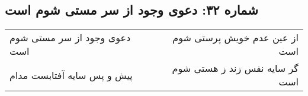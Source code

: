 \begin{center}
\section*{شماره ۳۲: دعوی وجود از سر مستی شوم است}
\label{sec:032}
\begin{longtable}{l p{0.5cm} r}
دعوی وجود از سر مستی شوم است
&&
از عین عدم خویش پرستی شوم است
\\
پیش و پس سایه آفتابست مدام
&&
گر سایه نفس زند ز هستی شوم است
\\
\end{longtable}
\end{center}
